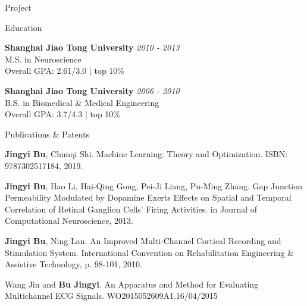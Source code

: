 \documentclass{resume} %
\begin{document}
\begin{rSection}{Project}
\end{rSection}


\begin{rSection}{Education}

{\bf Shanghai Jiao Tong University} \hfill {\em 2010 - 2013} \\ 
M.S. in Neuroscience \\
Overall GPA: 2.61/3.0 | top 10\%

{\bf Shanghai Jiao Tong University} \hfill {\em 2006 - 2010} \\ 
B.S. in Biomedical \& Medical Engineering \\
Overall GPA: 3.7/4.3 | top 10\%

\end{rSection}


\begin{rSection}{Publications \& Patents}

\begin{rSubsection}{}{}{}{}
\item \textbf{Jingyi Bu}, Chunqi Shi. Machine Learning: Theory and Optimization. ISBN: 9787302517184, 2019.
\\
\item \textbf{Jingyi Bu}, Hao Li, Hai-Qing Gong, Pei-Ji Liang, Pu-Ming Zhang. Gap Junction Permeability Modulated by Dopamine Exerts Effects on Spatial and Temporal Correlation of Retinal Ganglion Cells' Firing Activities. in Journal of Computational Neuroscience, 2013.
\\
\item \textbf{Jingyi Bu}, Ning Lan. An Improved Multi-Channel Cortical Recording and Stimulation System. International Convention on Rehabilitation Engineering \& Assistive Technology, p. 98-101, 2010.
\\
\item Wang Jin and \textbf{Bu Jingyi}. An Apparatus and Method for Evaluating Multichannel ECG Signals. WO2015052609A1.16/04/2015
\end{rSubsection}

\end{rSection}
\end{document}
